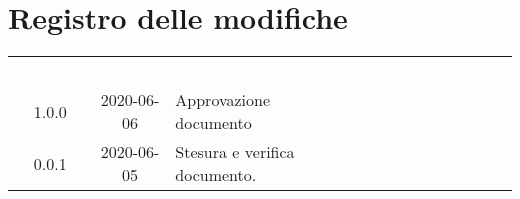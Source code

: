\section*{Registro delle modifiche}
{
	\centering
	\begin{longtable}{ c c C{4cm}  C{4cm}  C{3cm} }
		\textcolor{white}{\textbf{Versione}} & \textcolor{white}{\textbf{Data}} & \textcolor{white}{\textbf{Descrizione}} & \textcolor{white}{\textbf{Nominativo}} & \textcolor{white}{\textbf{Ruolo}}\\		
		1.0.0 & 2020-06-06 & Approvazione documento &  &\RdP{}\\	
		0.0.1 & 2020-06-05 & Stesura e verifica documento. &  &\reda{}\\		
		
	\end{longtable}

}